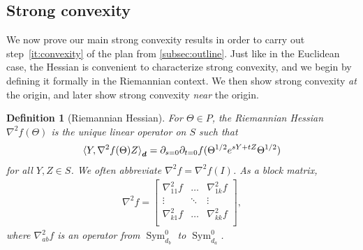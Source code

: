 \documentclass{article}
\newtheorem{definition}{Definition}
\renewcommand{\vec}{\bm}
\newcommand\Sym{\operatorname{Sym}}
\newcommand{\CF}[1]{{\color{purple}[CF: #1]}}
\begin{document}





\subsection{Strong convexity}
We now prove our main strong convexity results in order to carry out step~\ref{it:convexity} of the plan from \cref{subsec:outline}.
Just like in the Euclidean case, the Hessian is convenient to characterize strong convexity, and we begin by defining it formally in the Riemannian context.
We then show strong convexity \emph{at} the origin, and later show strong convexity \emph{near} the origin.

\begin{definition}[Riemannian Hessian]
For $\Theta \in P$, the \emph{Riemannian Hessian}~$\nabla^2 f(\Theta)$ is the unique linear operator on $S$ such that
\begin{align*}
  \braket{Y, \nabla^2 f(\Theta) Z}_{\vec d} = \partial_{s=0} \partial_{t=0} f(\Theta^{1/2} e^{sY + tZ} \Theta^{1/2})
\end{align*}
for all $Y, Z\in S$.
We often abbreviate $\nabla^2 f = \nabla^2 f(I)$.
As a block matrix,
\begin{align*}
  \nabla^2 f = \begin{bmatrix}
  \nabla_{11}^2 f & \dots & \nabla_{1k}^2 f \\
  \vdots & \ddots & \vdots \\
  \nabla_{k1}^2 f & \dots & \nabla_{kk}^2 f \\
  \end{bmatrix},
\end{align*}
where $\nabla_{ab}^2f$ is an operator from $\Sym_{d_b}^0$ to $\Sym_{d_a}^0$.
\end{definition}
\end{document}
